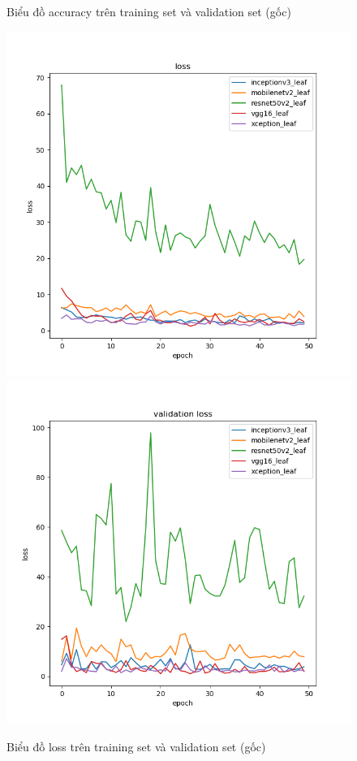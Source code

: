 \documentclass[a4paper,14pt]{extarticle}
\begin{document}
\begin{figure}[H]
			\caption{Biểu đồ accuracy trên training set và validation set (gốc)}
		\end{figure}

		\begin{figure}[H]
			\centering
			\includegraphics[scale=0.4]{images/leaf_loss.png}
			\includegraphics[scale=0.4]{images/leaf_val_loss.png}
			\caption{Biểu đồ loss trên training set và validation set (gốc)}
		\end{figure}
\end{document}
